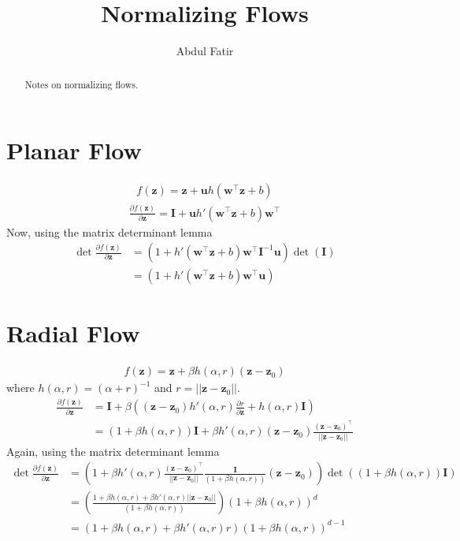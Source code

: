 \documentclass[]{article}
\title{Normalizing Flows}
\author{Abdul Fatir}
\date{}
\begin{document}
\maketitle

\begin{abstract}
Notes on normalizing flows.
\end{abstract}

\section{Planar Flow}
\begin{align*}
	f(\mathbf{z}) = \mathbf{z} + \mathbf{u}h(\mathbf{w}^\top\mathbf{z} + b)
\end{align*}
\begin{align*}
	\frac{\partial f(\mathbf{z})}{\partial \mathbf{z}} = \mathbf{I} + \mathbf{u}h'(\mathbf{w}^\top\mathbf{z} + b)\mathbf{w}^\top
\end{align*}
Now, using the matrix determinant lemma
\begin{align*}
\det\frac{\partial f(\mathbf{z})}{\partial \mathbf{z}} &= (1 + h'(\mathbf{w}^\top\mathbf{z} + b)\mathbf{w}^\top\mathbf{I}^{-1}\mathbf{u})\det(\mathbf{I})\\
&=(1 + h'(\mathbf{w}^\top\mathbf{z} + b)\mathbf{w}^\top\mathbf{u})
\end{align*}
\section{Radial Flow}
\begin{align*}
	f(\mathbf{z}) = \mathbf{z} + \beta h(\alpha,r)(\mathbf{z}-\mathbf{z}_0)
\end{align*}
where $h(\alpha,r) = (\alpha + r)^{-1}$ and $r = ||\mathbf{z}-\mathbf{z}_0||$.
\begin{align*}
\frac{\partial f(\mathbf{z})}{\partial \mathbf{z}} &= \mathbf{I} + \beta\left((\mathbf{z}-\mathbf{z}_0)h'(\alpha,r)\frac{\partial r}{\partial \mathbf{z}} + h(\alpha,r)\mathbf{I}\right)\\
&=(1+\beta h(\alpha,r))\mathbf{I} + \beta h'(\alpha,r)(\mathbf{z}-\mathbf{z}_0)\frac{(\mathbf{z}-\mathbf{z}_0)^\top}{||\mathbf{z}-\mathbf{z}_0||}
\end{align*}
Again, using the matrix determinant lemma
\begin{align*}
\det\frac{\partial f(\mathbf{z})}{\partial \mathbf{z}} &= \left(1 + \beta h'(\alpha,r)\frac{(\mathbf{z}-\mathbf{z}_0)^\top}{||\mathbf{z}-\mathbf{z}_0||}\frac{\mathbf{I}}{(1+\beta h(\alpha,r))}(\mathbf{z}-\mathbf{z}_0)\right)\det((1+\beta h(\alpha,r))\mathbf{I})\\
&=\left(\frac{1 + \beta h(\alpha,r) + \beta h'(\alpha,r)||\mathbf{z}-\mathbf{z}_0||}{(1+\beta h(\alpha,r))}\right)(1+\beta h(\alpha,r))^d\\
&=\left(1 + \beta h(\alpha,r) + \beta h'(\alpha,r)r\right)(1+\beta h(\alpha,r))^{d-1}\\
\end{align*}
\end{document}
